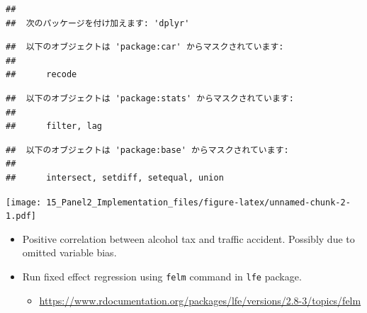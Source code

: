 \documentclass[]{book}
\newenvironment{Shaded}{\begin{snugshade}}{\end{snugshade}}
\newcommand{\KeywordTok}[1]{\textcolor[rgb]{0.13,0.29,0.53}{\textbf{#1}}}
\newcommand{\DataTypeTok}[1]{\textcolor[rgb]{0.13,0.29,0.53}{#1}}
\newcommand{\DecValTok}[1]{\textcolor[rgb]{0.00,0.00,0.81}{#1}}
\newcommand{\StringTok}[1]{\textcolor[rgb]{0.31,0.60,0.02}{#1}}
\newcommand{\OperatorTok}[1]{\textcolor[rgb]{0.81,0.36,0.00}{\textbf{#1}}}
\newcommand{\NormalTok}[1]{#1}
\providecommand{\tightlist}{%
  \setlength{\itemsep}{0pt}\setlength{\parskip}{0pt}}
\begin{document}
\begin{verbatim}
## 
##  次のパッケージを付け加えます: 'dplyr'
\end{verbatim}

\begin{verbatim}
##  以下のオブジェクトは 'package:car' からマスクされています: 
## 
##      recode
\end{verbatim}

\begin{verbatim}
##  以下のオブジェクトは 'package:stats' からマスクされています: 
## 
##      filter, lag
\end{verbatim}

\begin{verbatim}
##  以下のオブジェクトは 'package:base' からマスクされています: 
## 
##      intersect, setdiff, setequal, union
\end{verbatim}

\begin{Shaded}
\end{Shaded}

\texttt{[image: 15\_Panel2\_Implementation\_files/figure-latex/unnamed-chunk-2-1.pdf]}

\begin{itemize}
\item
  Positive correlation between alcohol tax and traffic accident.
  Possibly due to omitted variable bias.
\item
  Run fixed effect regression using \texttt{felm} command in
  \texttt{lfe} package.

  \begin{itemize}
  \tightlist
  \item
    \url{https://www.rdocumentation.org/packages/lfe/versions/2.8-3/topics/felm}
  \end{itemize}
\end{itemize}
\end{document}
